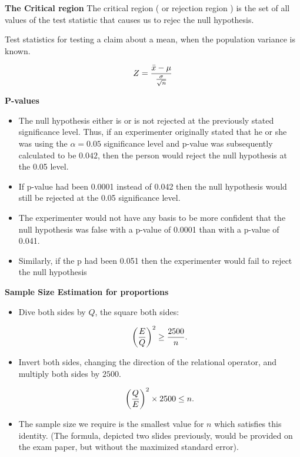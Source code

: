{
\textbf{The Critical region}
The critical region ( or rejection region ) is the set of all values of the test statistic that causes us to rejec the null hypothesis.

}
{

Test statistics for testing a claim about a mean, when the population variance is known.

\[ Z = {\bar{x}  - \mu \over {\sigma \over \sqrt{n}}} \]
}






\textbf{P-values}

\begin{itemize}
\item The null hypothesis either is or is not rejected at the previously stated significance level. Thus, if an experimenter originally stated that he or she was using the $\alpha = 0.05$ significance level and p-value was subsequently calculated to be $0.042$, then the person would reject the null hypothesis at the 0.05 level. \item If p-value had been 0.0001 instead of 0.042 then the null hypothesis would still be rejected at the 0.05 significance level.  \item
The experimenter would not have any basis to be more confident that the null hypothesis was false with a p-value of 0.0001 than with a p-value of 0.041. \item Similarly, if the p had been 0.051 then the experimenter would fail to reject the null hypothesis
\end{itemize}












\textbf{Sample Size Estimation for proportions}

\begin{itemize}

\item Dive both sides by $Q$, the square both sides:

\[ \left({E\over Q}\right)^2 \geq {2500 \over n}. \]

\item Invert both sides, changing the direction of the relational operator, and multiply both sides by $2500$.

\[ \left({Q\over E}\right)^2 \times 2500 \leq n. \]

\item The sample size we require is the smallest value for $n$ which satisfies this identity. (The formula,  depicted two slides previously, would be provided on the exam paper, but without the maximized standard error).
\end{itemize}



